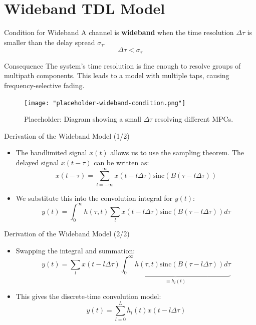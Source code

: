 \documentclass{beamer}
\begin{document}
	\section{Wideband TDL Model}
	
	\begin{frame}{Condition for Wideband}
		A channel is \textbf{wideband} when the time resolution $\Delta\tau$ is smaller than the delay spread $\sigma_\tau$.
		\[ \Delta\tau < \sigma_\tau \]
		
		\begin{block}{Consequence}
			The system's time resolution is fine enough to resolve groups of multipath components. This leads to a model with multiple taps, causing frequency-selective fading.
		\end{block}
		\begin{figure}
			\centering
			\texttt{[image: "placeholder-wideband-condition.png"]}
			\caption{Placeholder: Diagram showing a small $\Delta\tau$ resolving different MPCs.}
		\end{figure}
	\end{frame}
	
	\begin{frame}{Derivation of the Wideband Model (1/2)}
		\begin{itemize}
			\item The bandlimited signal $x(t)$ allows us to use the sampling theorem. The delayed signal $x(t-\tau)$ can be written as:
			\[ x(t-\tau) = \sum_{l=-\infty}^{\infty} x(t-l\Delta\tau) \text{sinc}(B(\tau - l\Delta\tau)) \]
			
			\item We substitute this into the convolution integral for $y(t)$:
			\[ y(t) = \int_0^{\infty} h(\tau, t) \sum_{l} x(t-l\Delta\tau) \text{sinc}(B(\tau-l\Delta\tau)) d\tau \]
		\end{itemize}
	\end{frame}
	
	\begin{frame}{Derivation of the Wideband Model (2/2)}
		\begin{itemize}
			\item Swapping the integral and summation:
			\[ y(t) = \sum_{l} x(t-l\Delta\tau) \underbrace{\int_0^{\infty} h(\tau, t) \text{sinc}(B(\tau-l\Delta\tau)) d\tau}_{\equiv h_l(t)} \]
			
			\item This gives the discrete-time convolution model:
			\[ y(t) = \sum_{l=0}^{L} h_l(t) x(t-l\Delta\tau) \]
		\end{itemize}
	\end{frame}
	
\end{document}
